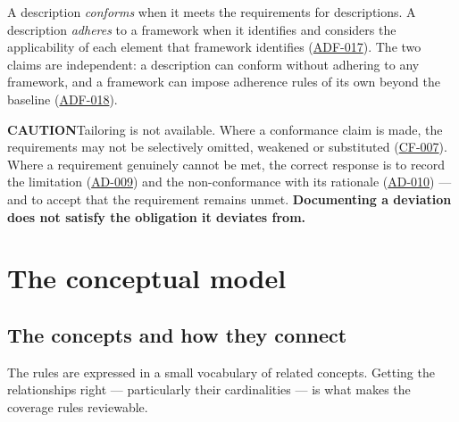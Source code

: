 \documentclass[11pt,a4paper]{report}
\newcommand{\calloutlead}[2]{{\sffamily\bfseries\footnotesize\color{#1}#2\quad}}
\newcommand{\risknote}[1]{\begin{riskbox}\calloutlead{brick}{CAUTION}#1\end{riskbox}}
\newcommand{\rref}[1]{\hyperref[rule:#1]{\textsf{\small #1}}}
\begin{document}
A description \emph{conforms} when it meets the requirements for descriptions.
A description \emph{adheres} to a framework when it identifies and considers the
applicability of each element that framework identifies
(\rref{ADF-017}). The two claims are independent: a
description can conform without adhering to any framework, and a framework can
impose adherence rules of its own beyond the baseline
(\rref{ADF-018}).

\risknote{Tailoring is not available. Where a conformance claim is made, the
requirements may not be selectively omitted, weakened or substituted
(\rref{CF-007}). Where a requirement genuinely cannot be met, the
correct response is to record the limitation
(\rref{AD-009}) and the non-conformance with its rationale
(\rref{AD-010}) --- and to accept that the requirement remains
unmet. \textbf{Documenting a deviation does not satisfy the obligation it
deviates from.}}

\chapter{The conceptual model}

\section{The concepts and how they connect}

The rules are expressed in a small vocabulary of related concepts. Getting the
relationships right --- particularly their cardinalities --- is what makes the
coverage rules reviewable.
\end{document}
